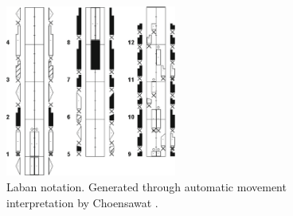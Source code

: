 \begin{figure}
	\centering
	\includegraphics[width=0.5\textwidth]{img/laban.png}
	\caption{Laban notation. Generated through automatic movement interpretation by Choensawat \cite{Choensawat2015}.}
	\label{fig:laban}
\end{figure}

